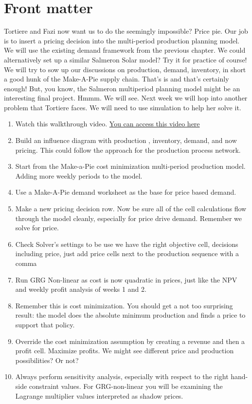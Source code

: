 \documentclass[
]{book}
\begin{document}
\hypertarget{front-matter}{%
\section{Front matter}\label{front-matter}}

Tortiere and Fazi now want us to do the seemingly impossible? Price pie. Our job is to insert a pricing decision into the multi-period production planning model. We will use the existing demand framework from the previous chapter. We could alternatively set up a similar Salmeron Solar model? Try it for practice of course! We will try to sow up our discussions on production, demand, inventory, in short a good hunk of the Make-A-Pie supply chain. That's is and that's certainly enough! But, you know, the Salmeron multiperiod planning model might be an interesting final project. Hmmm. We will see. Next week we will hop into another problem that Tortiere faces. We will need to use simulation to help her solve it.

\begin{enumerate}
\def\labelenumi{\arabic{enumi}.}
\item
  Watch this walkthrough video. \href{https://drive.google.com/drive/folders/1IiUmsB4u3j39ve8y-wpj6WK6D8uyp1FO?usp=sharing}{You can access this video here}
\item
  Build an influence diagram with production , inventory, demand, and now pricing. This could follow the approach for the production process network.
\item
  Start from the Make-a-Pie cost minimization multi-period production model. Adding more weekly periods to the model.
\item
  Use a Make-A-Pie demand worksheet as the base for price based demand.
\item
  Make a new pricing decision row. Now be sure all of the cell calculations flow through the model cleanly, especially for price drive demand. Remember we solve for price.
\item
  Check Solver's settings to be use we have the right objective cell, decisions including price, just add price cells next to the production sequence with a comma
\item
  Run GRG Non-linear as cost is now quadratic in prices, just like the NPV and weekly profit analysis of weeks 1 and 2.
\item
  Remember this is cost minimization. You should get a not too surprising result: the model does the absolute minimum production and finds a price to support that policy.
\item
  Override the cost minimization assumption by creating a revenue and then a profit cell. Maximize profits. We might see different price and production possibilities? Or not?
\item
  Always perform sensitivity analysis, especially with respect to the right hand-side constraint values. For GRG-non-linear you will be examining the Lagrange multiplier values interpreted as shadow prices.
\end{enumerate}
\end{document}
